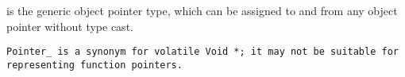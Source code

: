  is the generic object pointer type,
which can be assigned to and from any object pointer without type cast.

\note \tt{Pointer_} is a synonym for \tt{volatile Void *};
it may not be suitable for representing function pointers.
